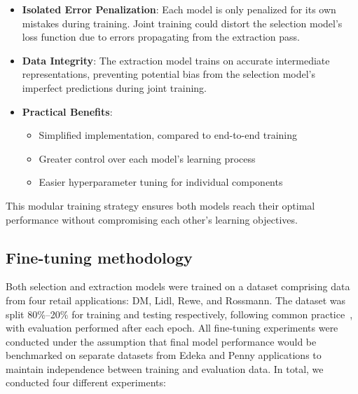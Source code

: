 \documentclass[licencjacka,en]{pracamgr}
\begin{document}
\begin{itemize}
    \item \textbf{Isolated Error Penalization}: Each model is only penalized for its own mistakes during training. Joint training could distort the selection model's loss function due to errors propagating from the extraction pass.

    \item \textbf{Data Integrity}: The extraction model trains on accurate intermediate representations, preventing potential bias from the selection model's imperfect predictions during joint training.

    \item \textbf{Practical Benefits}:
    \begin{itemize}
        \item Simplified implementation, compared to end-to-end training
        \item Greater control over each model's learning process
        \item Easier hyperparameter tuning for individual components
    \end{itemize}
\end{itemize}

This modular training strategy ensures both models reach their optimal performance without compromising each other's learning objectives.
\subsection{Fine-tuning methodology} \label{FTMethodologyBert}
Both selection and extraction models were trained on a dataset comprising data from four retail applications: DM, Lidl, Rewe, and Rossmann. The dataset was split 80\%--20\% for training and testing respectively, following common practice~\cite{pp}, with evaluation performed after each epoch. All fine-tuning experiments were conducted under the assumption that final model performance would be benchmarked on separate datasets from Edeka and Penny applications to maintain independence between training and evaluation data.
In total, we conducted four different experiments:
\end{document}
